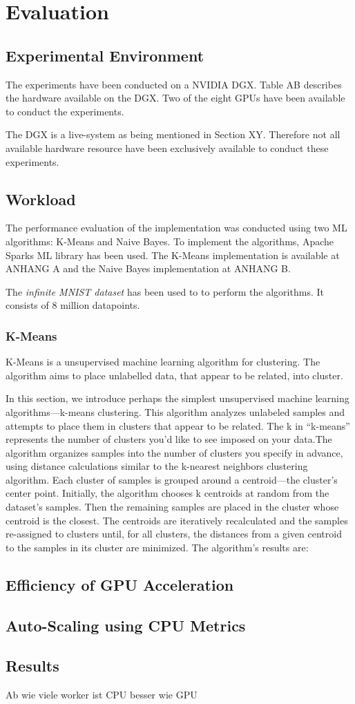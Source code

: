 \chapter{Evaluation}
\label{chap:07_evaluation}
%

\section{Experimental Environment}
The experiments have been conducted on a NVIDIA DGX.
Table AB describes the hardware available on the DGX.
Two of the eight GPUs have been available to conduct the experiments.


The DGX is a live-system as being mentioned in Section XY. Therefore not all available hardware resource have been exclusively available to conduct these experiments.

\section{Workload}
The performance evaluation of the implementation was conducted using two ML algorithms: K-Means and Naive Bayes.
To implement the algorithms, Apache Sparks ML library has been used. The K-Means implementation is available at ANHANG A and the Naive Bayes implementation at ANHANG B.


The \textit{infinite MNIST dataset}\cite{loosli2006InfiniteMNIST} has been used to to perform the algorithms. It consists of  8 million datapoints.


\subsection{K-Means}
K-Means is a unsupervised machine learning algorithm for clustering.
The algorithm aims to place unlabelled data, that appear to be related, into cluster.


In this section, we introduce perhaps the simplest unsupervised machine learning algorithms—k-means clustering. This algorithm analyzes unlabeled samples and attempts to place them in clusters that appear to be related. The k in “k-means” represents the number of clusters you’d like to see imposed on your data.The algorithm organizes samples into the number of clusters you specify in advance, using distance calculations similar to the k-nearest neighbors clustering algorithm. Each cluster of samples is grouped around a centroid—the cluster’s center point. Initially, the algorithm chooses k centroids at random from the dataset’s samples. Then the remaining samples are placed in the cluster whose centroid is the closest. The centroids are iteratively recalculated and the samples re-assigned to clusters until, for all clusters, the distances from a given centroid to the samples in its cluster are minimized. The algorithm’s results are:

\section{Efficiency of GPU Acceleration}


\section{Auto-Scaling using CPU Metrics}


\section{Results}
Ab wie viele worker ist CPU besser wie GPU

